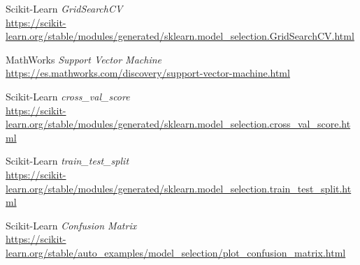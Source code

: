 \documentclass[11pt,a4paper]{article}
\begin{document}
\begin{thebibliography}{}
    Scikit-Learn \textit{GridSearchCV}
    \\\url{https://scikit-learn.org/stable/modules/generated/sklearn.model_selection.GridSearchCV.html}
    
    MathWorks \textit{Support Vector Machine}
    \\\url{https://es.mathworks.com/discovery/support-vector-machine.html}
    
    Scikit-Learn \textit{cross\_val\_score}
    \\\url{https://scikit-learn.org/stable/modules/generated/sklearn.model_selection.cross_val_score.html}
    
    Scikit-Learn \textit{train\_test\_split}
    \\\url{https://scikit-learn.org/stable/modules/generated/sklearn.model_selection.train_test_split.html}
    
    Scikit-Learn \textit{Confusion Matrix}
    \\\url{https://scikit-learn.org/stable/auto_examples/model_selection/plot_confusion_matrix.html}
    
    \end{thebibliography}
\end{document}
